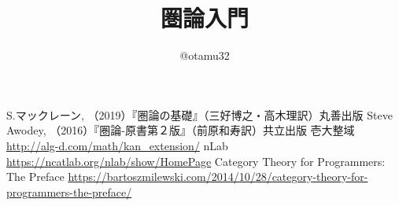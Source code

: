 \documentclass[uplatex,dvipdfmx]{jsarticle}
\begin{document}
	\title{圏論入門}
  \author{@otamu32}
	\maketitle
	\tableofcontents
	
  
  
	
  
  
	
  
  


	\begin{thebibliography}{99}
	 S.マックレーン, （2019）『圏論の基礎』（三好博之・高木理訳）丸善出版
	 Steve Awodey, （2016）『圏論-原書第２版』（前原和寿訳）共立出版
	 壱大整域 \url{http://alg-d.com/math/kan_extension/}
	 nLab \url{https://ncatlab.org/nlab/show/HomePage}
	 Category Theory for Programmers: The Preface \url{https://bartoszmilewski.com/2014/10/28/category-theory-for-programmers-the-preface/}
	\end{thebibliography}
\end{document}
